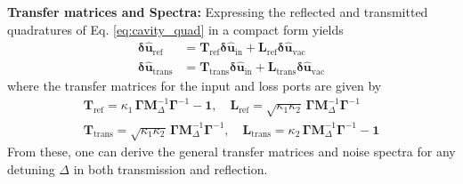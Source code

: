 \newpage 
\noindent \textbf{Transfer matrices and Spectra:} Expressing the reflected and transmitted quadratures of Eq. \eqref{eq:cavity_quad} in a compact form yields
\begin{equation}
  \begin{split}
   \mathbf{\delta \hat{u}_{\mathrm{ref}}} & = \mathbf{T}_{\mathrm{ref}}\mathbf{\delta \hat{u}_{\mathrm{in}}} + \mathbf{L}_{\mathrm{ref}}  \mathbf{\delta \hat{u}_{\mathrm{vac}}}
    \\
    \mathbf{\delta \hat{u}_{\mathrm{trans}}} & = \mathbf{T}_{\mathrm{trans}}  \mathbf{\delta \hat{u}_{\mathrm{in}}} + \mathbf{L}_{\mathrm{trans}}  \mathbf{\delta \hat{u}_{\mathrm{vac}}}
  \end{split}
\end{equation}
where the transfer matrices for the input and loss ports are given by
\begin{equation}
  \begin{split}
     \mathbf{T}_{\mathrm{ref}}= \kappa_1 \, \mathbf{\Gamma} \mathbf{M}^{-1}_\Delta \mathbf{\Gamma}^{-1}- \mathbf{1}, \quad \mathbf{L}_{\mathrm{ref}}=  \sqrt{\kappa_1 \kappa_2} \, \mathbf{\Gamma}  \mathbf{M}^{-1}_\Delta \mathbf{\Gamma}^{-1}\\
      \mathbf{T}_{\mathrm{trans}}=   \sqrt{\kappa_1 \kappa_2} \, \mathbf{\Gamma}  \mathbf{M}^{-1}_\Delta \mathbf{\Gamma}^{-1}, \quad \mathbf{L}_{\mathrm{trans}}= \kappa_2 \, \mathbf{\Gamma} \mathbf{M}^{-1}_\Delta \mathbf{\Gamma}^{-1}- \mathbf{1}
  \end{split}
\label{eq:cav_transf}
\end{equation}
From these, one can derive the general transfer matrices and noise spectra for any detuning $\Delta$ in both transmission and reflection. \\ 

